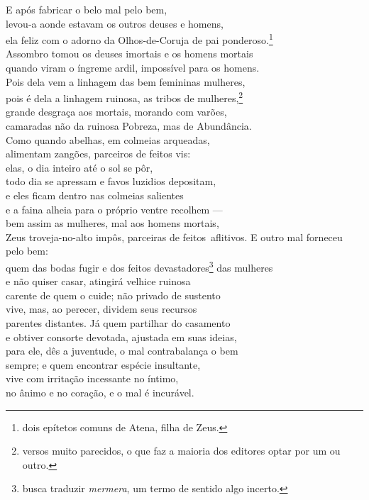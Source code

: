 \quad{}E após fabricar o belo mal pelo bem, \\
levou-a aonde estavam os outros deuses e homens,\\
ela feliz com o adorno da Olhos-de-Coruja de pai ponderoso.\footnote{dois epítetos comuns de Atena, filha de Zeus.}\\
Assombro tomou os deuses imortais e os homens mortais\\
quando viram o íngreme ardil, impossível para os homens.\\
Pois dela vem a linhagem das bem femininas mulheres, \\
pois é dela a linhagem ruinosa, as tribos de mulheres,\footnote{versos muito parecidos, o que faz a maioria dos editores optar por um ou outro.}\\
grande desgraça aos mortais, morando com varões,\\
camaradas não da ruinosa Pobreza, mas de Abundância.\\
Como quando abelhas, em colmeias arqueadas,\\
alimentam zangões, parceiros de feitos vis: \\
elas, o dia inteiro até o sol se pôr,\\
todo dia se apressam e favos luzidios depositam,\\
e eles ficam dentro nas colmeias salientes\\
e a faina alheia para o próprio ventre recolhem ---\\
bem assim as mulheres, mal aos homens mortais, \\
Zeus troveja-no-alto impôs, parceiras de feitos\
aflitivos. E outro mal forneceu pelo bem:\\
quem das bodas fugir e dos feitos devastadores\footnote{busca traduzir \emph{mermera}, um termo de sentido algo incerto.} das mulheres\\
e não quiser casar, atingirá velhice ruinosa\\
carente de quem o cuide; não privado de sustento \\
vive, mas, ao perecer, dividem seus recursos\\
parentes distantes. Já quem partilhar do casamento\\
e obtiver consorte devotada, ajustada em suas ideias,\\
para ele, dês a juventude, o mal contrabalança o bem\\
sempre; e quem encontrar espécie insultante, \\
vive com irritação incessante no íntimo,\\
no ânimo e no coração, e o mal é incurável.

